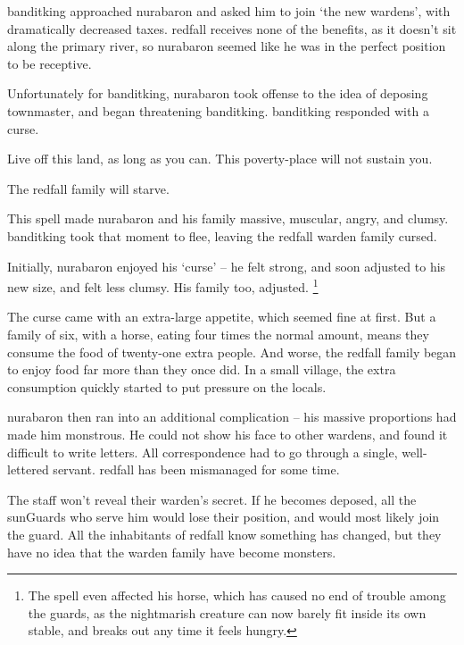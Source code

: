 \label{desperatemeasures}


\begin{exampletext}
  \noindent
  \Gls{banditking} approached \gls{nurabaron} and asked him to join `the new \glspl{warden}', with dramatically decreased taxes.
  \Gls{redfall} receives none of the benefits, as it doesn't sit along the primary river, so \gls{nurabaron} seemed like he was in the perfect position to be receptive.

  Unfortunately for \gls{banditking}, \gls{nurabaron} took offense to the idea of deposing \gls{townmaster}, and began threatening \gls{banditking}.
  \Gls{banditking} responded with a curse.

  \begin{speechtext}
    Live off this land, as long as you can.
    This poverty-place will not sustain you.

    The \gls{redfall} family will starve.

  \end{speechtext}
  This spell made \gls{nurabaron} and his family massive, muscular, angry, and clumsy.
  \Gls{banditking} took that moment to flee, leaving the \gls{redfall} \gls{warden} family cursed.

  Initially, \gls{nurabaron} enjoyed his `curse' -- he felt strong, and soon adjusted to his new size, and felt less clumsy.
  His family too, adjusted.%
  \footnote{The spell even affected his horse, which has caused no end of trouble among the guards, as the nightmarish creature can now barely fit inside its own stable, and breaks out any time it feels hungry.}

  \null
  The curse came with an extra-large appetite, which seemed fine at first.
  But a family of six, with a horse, eating four times the normal amount, means they consume the food of twenty-one extra people.
  And worse, the \gls{redfall} family began to enjoy food far more than they once did.
  In a small \gls{village}, the extra consumption quickly started to put pressure on the locals.

  \Gls{nurabaron} then ran into an additional complication -- his massive proportions had made him monstrous.
  He could not show his face to other \glspl{warden}, and found it difficult to write letters.
  All correspondence had to go through a single, well-lettered servant.
  \Gls{redfall} has been mismanaged for some time.

  The staff won't reveal their \gls{warden}'s secret.
  If he becomes deposed, all the \glspl{sunGuard} who serve him would lose their position, and would most likely join the \gls{guard}.
  All the inhabitants of \gls{redfall} know something has changed, but they have no idea that the \gls{warden} family have become monsters.
\end{exampletext}

